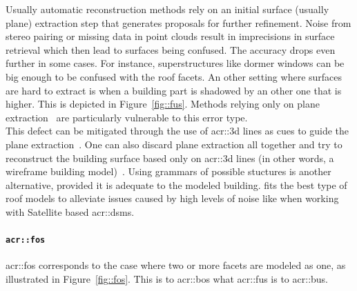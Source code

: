                 Usually automatic reconstruction methods rely on an initial surface (usually plane) extraction step that generates proposals for further refinement.
                Noise from stereo pairing or missing data in point clouds result in imprecisions in surface retrieval which then lead to surfaces being confused.
                The accuracy drops even further in some cases.
                For instance, superstructures like dormer windows can be big enough to be confused with the roof facets.
                An other setting where surfaces are hard to extract is when a building part is shadowed by an other one that is higher.
                This is depicted in Figure~\ref{fig::fus}.
                Methods relying only on plane extraction~\parencite{durupt2006automatic,taillandier2004automatic,nan2017polyfit} are particularly vulnerable to this error type.\\

                This defect can be mitigated through the use of \gls{acr::3d} lines as cues to guide the plane extraction~\parencite{zebedin2008fusion,sinha2009piecewise}.
                One can also discard plane extraction all together and try to reconstruct the building surface based only on \gls{acr::3d} lines (in other words, a wireframe building model)~\parencite{langlois2019surface,hofer2017efficient}.
                Using grammars of possible stuctures is another alternative, provided it is adequate to the modeled building.
                \textcite{lafarge2008structural} fits the best type of roof models to alleviate issues caused by high levels of noise like when working with Satellite based \glspl{acr::dsm}.

            \paragraph{\texttt{\acrlong*{acr::fos}}}
                \gls{acr::fos} corresponds to the case where two or more facets are modeled as one, as illustrated in Figure~\ref{fig::fos}.
                This is to \gls{acr::bos} what \gls{acr::fus} is to \gls{acr::bus}.\\

